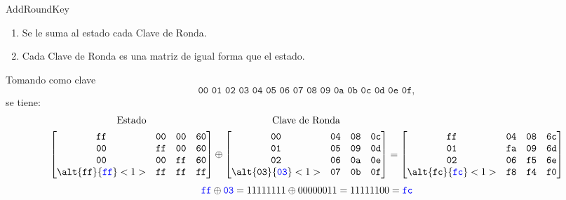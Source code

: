 \documentclass[10pt,t]{beamer}
\begin{document}
\begin{frame}
    \begin{block}{\centering AddRoundKey}
        \begin{enumerate}[label=--]
            \item Se le suma al estado cada Clave de Ronda.
            \item Cada Clave de Ronda es una matriz de igual forma que el estado.
        \end{enumerate}
    \end{block}
    Tomando como clave
    \[\texttt{00 01 02 03 04 05 06 07 08 09 0a 0b 0c 0d 0e 0f},\]
    se tiene:
    \[
    \overset{\raisebox{6pt}{\normalsize Estado}}{
    \begin{bmatrix}
        \texttt{ff} & \texttt{00} & \texttt{00} & \texttt{60} \\
        \texttt{00} & \texttt{ff} & \texttt{00} & \texttt{60} \\
        \texttt{00} & \texttt{00} & \texttt{ff} & \texttt{60} \\
        \alt{\texttt{ff}}{\textcolor{azul}{\texttt{ff}}}<1>& \texttt{ff} & \texttt{ff} & \texttt{ff}
    \end{bmatrix}}
    \oplus
    \overset{\raisebox{6pt}{\normalsize Clave de Ronda}}{
    \begin{bmatrix}
        \texttt{00} & \texttt{04} & \texttt{08} & \texttt{0c} \\
        \texttt{01} & \texttt{05} & \texttt{09} & \texttt{0d} \\
        \texttt{02} & \texttt{06} & \texttt{0a} & \texttt{0e} \\
        \alt{\texttt{03}}{\textcolor{azul}{\texttt{03}}}<1> & \texttt{07} & \texttt{0b} & \texttt{0f}
    \end{bmatrix}}
    =
    \begin{bmatrix}
        \texttt{ff} & \texttt{04} & \texttt{08} & \texttt{6c} \\
        \texttt{01} & \texttt{fa} & \texttt{09} & \texttt{6d} \\
        \texttt{02} & \texttt{06} & \texttt{f5} & \texttt{6e} \\
        \alt{\texttt{fc}}{\textcolor{verde}{\texttt{fc}}}<1> & \texttt{f8} & \texttt{f4} & \texttt{f0}
    \end{bmatrix}
    \]
    \pause
    \[\textcolor{azul}{\texttt{ff}} \oplus \textcolor{azul}{\texttt{03}} = 11111111 \oplus 00000011 = 11111100 = \textcolor{verde}{\texttt{fc}}\]

\end{frame}
\end{document}
